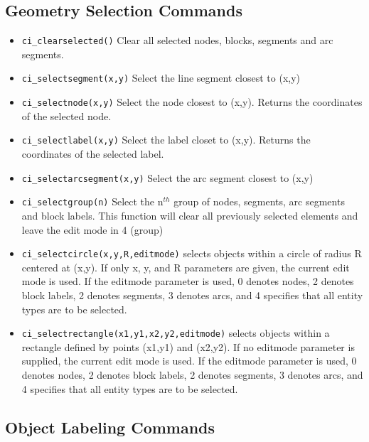 \subsection{Geometry Selection Commands}

\begin{itemize}
\item {\tt ci\_clearselected()} Clear all selected nodes, blocks, segments and arc
segments.

\item {\tt ci\_selectsegment(x,y)} Select the line segment closest to (x,y)

\item {\tt ci\_selectnode(x,y)} Select the node closest to (x,y).
Returns the coordinates of the selected node.

\item {\tt ci\_selectlabel(x,y)} Select the label closet to (x,y).
Returns the coordinates of the selected label.

\item {\tt ci\_selectarcsegment(x,y)} Select the arc segment closest to (x,y)

\item {\tt ci\_selectgroup(n)} Select the n$^{th}$ group of nodes, segments, arc
segments and block labels. This function will clear all previously selected
elements and leave the edit mode in 4 (group)

\item{\tt ci\_selectcircle(x,y,R,editmode)} selects objects within a circle of radius
R centered at (x,y).  If only x, y, and R parameters are given, the current
edit mode is used.  If the editmode parameter is used, 0 denotes nodes, 2
denotes block labels, 2 denotes segments, 3 denotes arcs, and 4 specifies
that all entity types are to be selected.

\item{\tt ci\_selectrectangle(x1,y1,x2,y2,editmode)} selects objects within a rectangle
defined by points (x1,y1) and (x2,y2). If no editmode parameter is supplied,
the current edit mode is used.  If the editmode parameter is used, 0 denotes
nodes, 2 denotes block labels, 2 denotes segments, 3 denotes arcs, and 4 
specifies that all entity types are to be selected.

\end{itemize}


\subsection{Object Labeling Commands}

